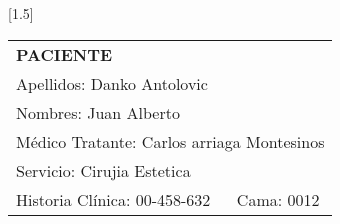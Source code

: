 \documentclass[10pt,a4paper]{article}
\begin{document}
 
\begin{minipage}{10cm}
\end{minipage}
\hfill
\begin{minipage}{10cm}
\begin{flushleft}
\scalebox{1.4}[1.5]{
\begin{tabular}{|p{3cm}p{2.3cm}|}
\hline 
\multicolumn{2}{|l|}{\scriptsize{\textbf{PACIENTE}}}\\
\multicolumn{2}{|p{5.3cm}|}{\scriptsize{Apellidos: Danko Antolovic}}\\ 
\multicolumn{2}{|p{5.3cm}|}{\scriptsize{Nombres: Juan Alberto}}\\ 
\multicolumn{2}{|p{5.3cm}|}{\scriptsize{M\'edico Tratante: Carlos arriaga Montesinos}}\\ 
\hline 
\multicolumn{2}{|p{5.3cm}|}{\scriptsize{Servicio: Cirujia Estetica}}\\
\hline 
\scriptsize{Historia Cl\'inica: 00-458-632}&\scriptsize{Cama: 0012} \\ 
\hline 
\end{tabular}}
\end{flushleft}
\end{minipage}
\end{document}
